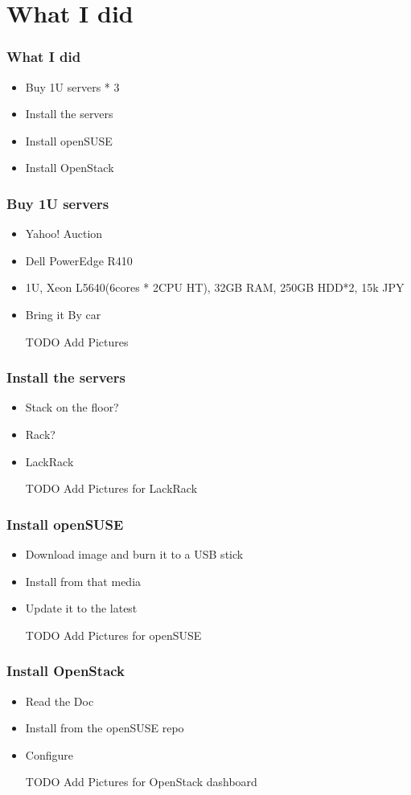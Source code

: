 \documentclass[aspectratio=169,11pt,hyperref={colorlinks=true}]{beamer}
\begin{document}
\section{What I did}
\begin{frame}
  \frametitle{What I did}
  \begin{itemize}
    \item Buy 1U servers * 3
    \item Install the servers
    \item Install openSUSE
    \item Install OpenStack
  \end{itemize}
\end{frame}

\begin{frame}
  \frametitle{Buy 1U servers}
  \begin{itemize}
    \item Yahoo! Auction
    \item Dell PowerEdge R410
    \item 1U, Xeon L5640(6cores * 2CPU HT), 32GB RAM, 250GB HDD*2, 15k JPY
    \item Bring it By car
    \item [TODO] Add Pictures
  \end{itemize}
\end{frame}

\begin{frame}
  \frametitle{Install the servers}
  \begin{itemize}
    \item Stack on the floor?
    \item Rack?
    \item LackRack
    \item [TODO] Add Pictures for LackRack
  \end{itemize}
\end{frame}

\begin{frame}
  \frametitle{Install openSUSE}
  \begin{itemize}
    \item Download image and burn it to a USB stick
    \item Install from that media
    \item Update it to the latest
    \item [TODO] Add Pictures for openSUSE
  \end{itemize}
\end{frame}

\begin{frame}
  \frametitle{Install OpenStack}
  \begin{itemize}
    \item Read the Doc
    \item Install from the openSUSE repo
    \item Configure
    \item [TODO] Add Pictures for OpenStack dashboard
  \end{itemize}
\end{frame}
\end{document}
